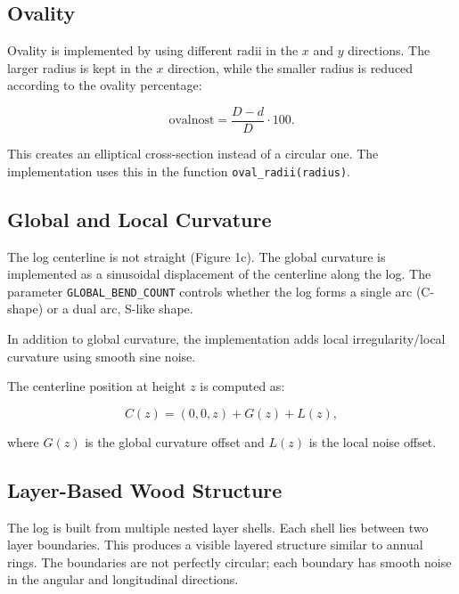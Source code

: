 \documentclass{egpubl}
\begin{document}

\subsection{Ovality}

Ovality is implemented by using different radii in the \(x\) and \(y\) directions. The larger radius is kept in the \(x\) direction, while the smaller radius is reduced according to the ovality percentage:

\[
\text{ovalnost} = \frac{D - d}{D} \cdot 100.
\]

This creates an elliptical cross-section instead of a circular one. The implementation uses this in the function \texttt{oval\_radii(radius)}.


\subsection{Global and Local Curvature}

The log centerline is not straight (Figure 1c). The global curvature is implemented as a sinusoidal displacement of the centerline along the log. The parameter \texttt{GLOBAL\_BEND\_COUNT} controls whether the log forms a single arc (C-shape) or a dual arc, S-like shape.

In addition to global curvature, the implementation adds local irregularity/local curvature using smooth sine noise.

The centerline position at height \(z\) is computed as:

\[
C(z) = (0,0,z) + G(z) + L(z),
\]

where \(G(z)\) is the global curvature offset and \(L(z)\) is the local noise offset.


\subsection{Layer-Based Wood Structure}

The log is built from multiple nested layer shells. Each shell lies between two layer boundaries. This produces a visible layered structure similar to annual rings. The boundaries are not perfectly circular; each boundary has smooth noise in the angular and longitudinal directions.
\end{document}
